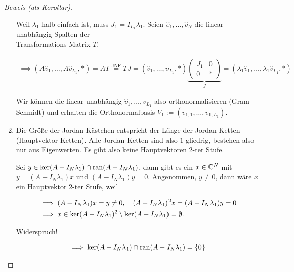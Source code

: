 \begin{proof}[Beweis (als Korollar)]
\begin{enumerate}[label = \arabic*.]
        Weil $\lambda_1$ halb-einfach ist, muss $J_1 = I_{L_1} \lambda_1$.
        Seien $\hat v_1, \dots, \hat v_N$ die linear unabhängig Spalten der \\ Transformations-Matrix $T$.
    
        \begin{align*}
            \implies
            (A \hat v_1, \dots, A \hat v_{L_1}, \ast)
            =
            A T
            \stackrel
            {
                \text{JNF}
            }{=}
            T J
            =
            (\hat v_1, \dots, \hat v_{L_1}, \ast)
            \underbrace
            {
                \begin{pmatrix}
                    J_1 & 0 \\
                    0   & \ast
                \end{pmatrix}
            }_J
            =
            (\lambda_1 \hat v_1, \dots, \lambda_1 \hat v_{L_1}, \ast)
        \end{align*}
    
        Wir können die linear unabhängig $\hat v_1, \dots, v_{L_1}$ also orthonormalisieren (Gram-Schmidt) und erhalten die Orthonormalbasis $V_1 := (v_{1, 1}, \dots, v_{1, L_1})$.

        \item Die Größe der Jordan-Kästchen entspricht der Länge der Jordan-Ketten (Hauptvektor-Ketten).
        Alle Jordan-Ketten sind also $1$-gliedrig, bestehen also nur aus  Eigenwerten.
        Es gibt also keine Hauptvektoren $2$-ter Stufe.
    
        Sei $y \in \operatorname{ker}(A - I_N \lambda_1) \cap \operatorname{ran}(A - I_N \lambda_1)$, dann gibt es ein $x \in \mathbb{C}^N$ mit $y = (A - I_N \lambda_1) x$ und $(A - I_N \lambda_1) y = 0$.
        Angenommen, $y \neq 0$, dann wäre $x$ ein Hauptvektor $2$-ter Stufe, weil

        \begin{align*}
            & \implies
            (A - I_N \lambda_1) x = y \neq 0,
            \quad
            (A - I_N \lambda_1)^2 x = (A - I_N \lambda_1) y = 0 \\
            & \implies
            x \in \operatorname{ker}(A - I_N \lambda_1)^2 \setminus \operatorname{ker}(A - I_N \lambda_1) = \emptyset.
        \end{align*}

        Widerspruch!
    
        \begin{align*}
            \implies
            \operatorname{ker}(A - I_N \lambda_1) \cap \operatorname{ran}(A - I_N \lambda_1) = {\left \{ 0 \right \}}
        \end{align*}
    

\end{enumerate}
\end{proof}
